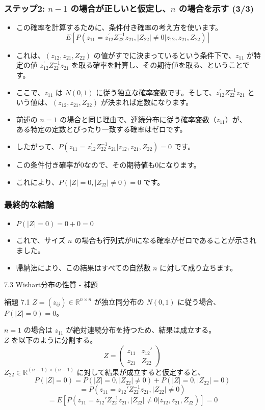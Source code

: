 \documentclass[aspectratio=169]{beamer}
\begin{document}
\begin{frame}
\frametitle{ステップ2: $n-1$ の場合が正しいと仮定し、$n$ の場合を示す (3/3)}
\begin{itemize}
    \item この確率を計算するために、条件付き確率の考え方を使います。
    \[ E[P(z_{11}=z_{12}^{\prime}Z_{22}^{-1}z_{21},|Z_{22}|\ne0|z_{12},z_{21},Z_{22})] \]
    \item これは、$(z_{12},z_{21},Z_{22})$ の値がすでに決まっているという条件下で、$z_{11}$ が特定の値 $z_{12}^{\prime}Z_{22}^{-1}z_{21}$ を取る確率を計算し、その期待値を取る、ということです。
    \item ここで、$z_{11}$ は $N(0,1)$ に従う独立な確率変数です。そして、$z_{12}^{\prime}Z_{22}^{-1}z_{21}$ という値は、$(z_{12},z_{21},Z_{22})$ が決まれば定数になります。
    \item 前述の $n=1$ の場合と同じ理由で、連続分布に従う確率変数（$z_{11}$）が、\\ある特定の定数とぴったり一致する確率はゼロです。
    \item したがって、$P(z_{11}=z_{12}^{\prime}Z_{22}^{-1}z_{21}|z_{12},z_{21},Z_{22})=0$ です。
    \item この条件付き確率が0なので、その期待値も0になります。
    \item これにより、$P(|Z|=0,|Z_{22}|\ne0)=0$ です。
\end{itemize}
\end{frame}

\begin{frame}
\frametitle{最終的な結論}
\begin{itemize}
    \item $P(|Z|=0)=0+0=0$
    \item これで、サイズ $n$ の場合も行列式が0になる確率がゼロであることが示されました。
    \item 帰納法により、この結果はすべての自然数 $n$ に対して成り立ちます。
\end{itemize}
\end{frame}


\begin{frame}{7.3 Wishart分布の性質 - 補題}
\begin{block}{補題 7.1}
$Z = (z_{ij}) \in \mathbb{R}^{n \times n}$ が独立同分布の $N(0, 1)$ に従う場合、$P(|Z| = 0) = 0$。
\end{block}

$n=1$ の場合は $z_{11}$ が絶対連続分布を持つため、結果は成立する。\\
$Z$ を以下のように分割する。
\[
Z = \begin{pmatrix} z_{11} & z_{12}' \\ z_{21} & Z_{22} \end{pmatrix}
\]
$Z_{22} \in \mathbb{R}^{(n-1) \times (n-1)}$ に対して結果が成立すると仮定すると、
\[
P(|Z|=0) = P(|Z|=0, |Z_{22}| \ne 0) + P(|Z|=0, |Z_{22}|=0)
\]
\[
= P(z_{11} = z_{12}'Z_{22}^{-1}z_{21}, |Z_{22}| \ne 0)
\]
\[
= E[P(z_{11} = z_{12}'Z_{22}^{-1}z_{21}, |Z_{22}| \ne 0 | z_{12}, z_{21}, Z_{22})] = 0
\]
\end{frame}
\end{document}
